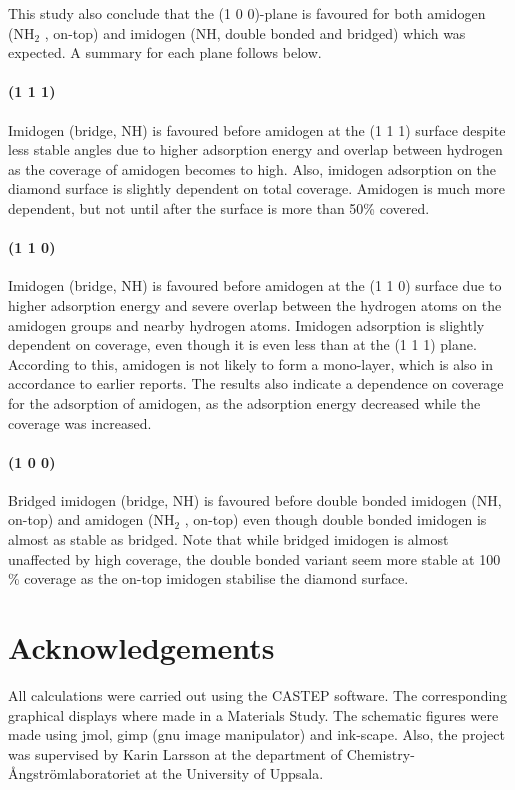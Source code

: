 \documentclass[10pt,a4paper]{article}
\begin{document}
 This study also conclude that the (1 0 0)-plane is favoured for both amidogen (NH$_2$ , on-top) and imidogen (NH, double bonded and bridged) which was expected. A summary for each plane follows below.

\paragraph*{(1 1 1)} Imidogen (bridge, NH) is favoured before amidogen at the (1 1 1) surface despite less stable angles due to higher adsorption energy and overlap between hydrogen as the coverage of amidogen becomes to high. Also, imidogen adsorption on the diamond surface is slightly dependent on total coverage. Amidogen is much more dependent, but not until after the surface is more than 50\% covered. 
\paragraph*{(1 1 0)} Imidogen (bridge, NH) is favoured before amidogen at the (1 1 0) surface due to higher adsorption energy and severe overlap between the hydrogen atoms on the amidogen groups and nearby hydrogen atoms. Imidogen adsorption is slightly dependent on coverage, even though it is even less than at the (1 1 1) plane. According to this, amidogen is not likely to form a mono-layer, which is also in accordance to earlier reports. The results also indicate a dependence on coverage for the adsorption of amidogen, as the adsorption energy decreased while the coverage was increased. 
\paragraph*{(1 0 0)} Bridged imidogen (bridge, NH) is favoured before double bonded imidogen (NH, on-top) and amidogen (NH$_2$ , on-top) even though double bonded imidogen is almost as stable as bridged. Note that while bridged imidogen is almost unaffected by high coverage, the double bonded variant seem more stable at 100 \% coverage as the on-top imidogen stabilise the diamond surface.



\section*{Acknowledgements}
All calculations were carried out using the CASTEP software. The corresponding graphical displays where made in a Materials Study. The schematic figures were made using jmol, gimp (gnu image manipulator) and ink-scape.  Also, the project was supervised by Karin Larsson at the department of Chemistry-Ångströmlaboratoriet at the University of Uppsala.
\end{document}
